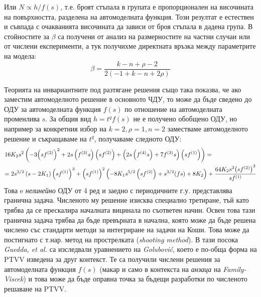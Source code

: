 Или $N \propto h/f(s)$, т.е. броят стъпала в групата е пропорционален на височината на повърхността, разделена на автомоделната функция. Този резултат е естествен и съвпада с очакванията височината да зависи от броя стъпала в дадена група. В \cite{Kozlov2022} стойностите за $\beta$ са получени от анализ на размерностите на частни случаи или от числени експерименти, а тук получихме директната връзка между параметрите на модела:
\begin{equation}
    \beta = \frac{{k - n + \rho  - 2}}{{2\left( { - 1 + k - n + 2\rho } \right)}}
    \label{eq:beta_explicit}
\end{equation}

Теорията на инвариантните под разтягане решения също така показва, че ако заместим автомоделното решение в основното ЧДУ, то може да бъде сведено до ОДУ за автомоделната функция $f(s)$ по отношение на автомоделната променлива $s$. За общия вид $h  = t^q f(s)$ не е получено обобщено ОДУ, но например за конкретния избор на  $k = 2, \rho  = 1, n = 2$ заместваме автомоделното решение и съкращаваме на $t^q$, получаваме следното ОДУ:
\[\begin{gathered}
  16{K_2}{s^2}\left( { - 3{{\left( {s{f^{(2)}}} \right)}^2} + 2s\left( {{f^{(3)}}s} \right)\left( {s{f^{(2)}}} \right) + \left( {2s\left( {{f^{(4)}}s} \right) + 7{f^{(3)}}s} \right)\left( {s{f^{(1)}}} \right)} \right) =  \hfill \\
   = 2{s^{3/2}}\left( {s - 2{K_1}} \right){\left( {s{f^{(1)}}} \right)^3} + {\left( {s{f^{(1)}}} \right)^2}\left( { - 8{K_1}{s^{5/2}}\left( {s{f^{(2)}}} \right) + {s^{3/2}}(fs) + 8{K_2}} \right) + \frac{{64{K_2}{s^3}{{\left( {s{f^{(2)}}} \right)}^3}}}{{s{f^{(1)}}}} \hfill \\ 
\end{gathered} \]
Това e \textit{нелинейно} ОДУ от 4 ред и заедно с периодичните г.у. представлява гранична задача. Численото му решение изисква специално третиране, тъй като трябва да се прескалира началната вицинала по съответен начин. Освен това тази гранична задача трябва да бъде превърната в начална, която може да бъде решена числено със стандарти методи за интегриране на задачи на Коши. Това може да постигнато с т.нар. метод на прострелката (\textit{shooting method}). В тази посока \textit{Guedda, et al.} \cite{Guedda2022} са изследвали уравнението на \textit{Golubović}, което е по-обща форма на PTVV изведена за друг контекст. Те са получили числени решения за автомоделната функция $f(s)$ (макар и само в контекста на \textit{анзаца} на \textit{Family-Viscek}) и това може да бъде оправна точка за бъдещи разработки по численото решаване на PTVV.

